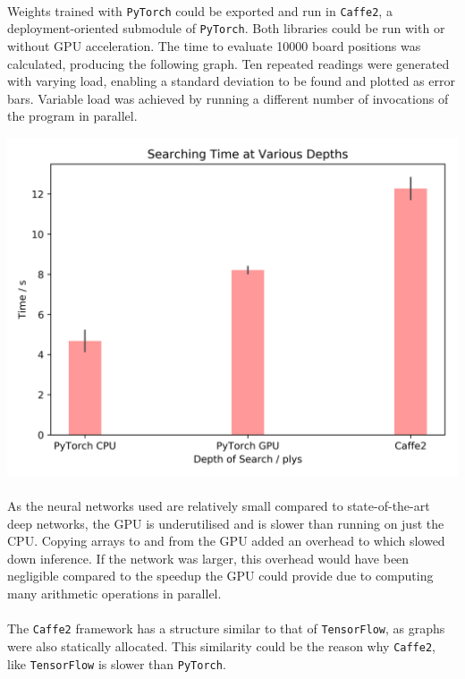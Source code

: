 \documentclass[12pt,a4paper]{book}
\begin{document}
\paragraph{} Weights trained with \texttt{PyTorch} could be exported and run in \texttt{Caffe2}, a deployment-oriented submodule of \texttt{PyTorch}. Both libraries could be run with or without GPU acceleration. The time to evaluate 10000 board positions was calculated, producing the following graph. Ten repeated readings were generated with varying load, enabling a standard deviation to be found and plotted as error bars. Variable load was achieved by running a different number of invocations of the program in parallel.

\begin{center}
  \includegraphics[scale=0.8]{ipc.png}
\end{center}

\paragraph{} As the neural networks used are relatively small compared to state-of-the-art deep networks, the GPU is underutilised and is slower than running on just the CPU. Copying arrays to and from the GPU added an overhead to which slowed down inference. If the network was larger, this overhead would have been negligible compared to the speedup the GPU could provide due to computing many arithmetic operations in parallel.

\paragraph{} The \texttt{Caffe2} framework has a structure similar to that of \texttt{TensorFlow}, as graphs were also statically allocated. This similarity could be the reason why \texttt{Caffe2}, like \texttt{TensorFlow} is slower than \texttt{PyTorch}.
\end{document}
